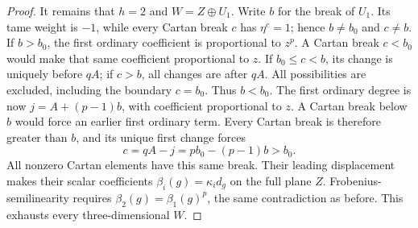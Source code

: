 \begin{proof}
It remains that \(h=2\) and \(W=Z\oplus U_1\).
Write \(b\) for the break of \(U_1\). Its tame weight is \(-1\),
while every Cartan break \(c\) has \(\eta^c=1\); hence
\(b\ne b_0\) and \(c\ne b\).
If \(b>b_0\), the first ordinary coefficient is proportional
to \(z^p\). A Cartan break \(c<b_0\) would make that same
coefficient proportional to \(z\). If \(b_0\le c<b\),
its change is uniquely before \(qA\); if \(c>b\), all changes
are after \(qA\). All possibilities are excluded, including
the boundary \(c=b_0\). Thus \(b<b_0\).
The first ordinary degree is now \(j=A+(p-1)b\), with coefficient
proportional to \(z\). A Cartan break below \(b\) would force
an earlier first ordinary term. Every Cartan break is therefore
greater than \(b\), and its unique first change forces
\[
 c=qA-j=p b_0-(p-1)b>b_0 .
 \tag{B-RD67.8}
\]
All nonzero Cartan elements have this same break. Their leading
displacement makes their scalar coefficients
\(\beta_i(g)=\kappa_i d_g\) on the full plane \(Z\).
Frobenius-semilinearity requires
\(\beta_2(g)=\beta_1(g)^p\), the same contradiction as before.
This exhausts every three-dimensional \(W\).
\end{proof}

